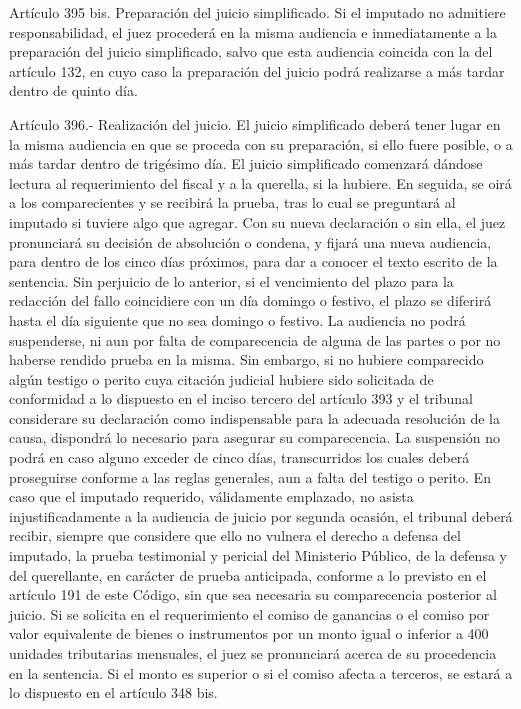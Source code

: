     Artículo 395 bis. Preparación del juicio simplificado. Si el imputado no admitiere responsabilidad, el juez procederá en la misma audiencia e inmediatamente a la preparación del juicio simplificado, salvo que esta audiencia coincida con la del artículo 132, en cuyo caso la preparación del juicio podrá realizarse a más tardar dentro de quinto día.


    Artículo 396.- Realización del juicio. El juicio simplificado deberá tener lugar en la misma audiencia en que se proceda con su preparación, si ello fuere posible, o a más tardar dentro de trigésimo día.
    El juicio simplificado comenzará dándose lectura al requerimiento del fiscal y a la querella, si la hubiere. En seguida, se oirá a los comparecientes y se recibirá la prueba, tras lo cual se preguntará al imputado si tuviere algo que agregar. Con su nueva declaración o sin ella, el juez pronunciará su decisión de absolución o condena, y fijará una nueva audiencia, para dentro de los cinco días próximos, para dar a conocer el texto escrito de la sentencia. Sin perjuicio de lo anterior, si el vencimiento del plazo para la redacción del fallo coincidiere con un día domingo o festivo, el plazo se diferirá hasta el día siguiente que no sea domingo o festivo.
    La audiencia no podrá suspenderse, ni aun por falta de comparecencia de alguna de las partes o por no haberse rendido prueba en la misma.
    Sin embargo, si no hubiere comparecido algún testigo o perito cuya citación judicial hubiere sido solicitada de conformidad a lo dispuesto en el inciso tercero del artículo 393 y el tribunal considerare su declaración como indispensable para la adecuada resolución de la causa, dispondrá lo necesario para asegurar su comparecencia. La suspensión no podrá en caso alguno exceder de cinco días, transcurridos los cuales deberá proseguirse conforme a las reglas generales, aun a falta del testigo o perito.
    En caso que el imputado requerido, válidamente emplazado, no asista injustificadamente a la audiencia de juicio por segunda ocasión, el tribunal deberá recibir, siempre que considere que ello no vulnera el derecho a defensa del imputado, la prueba testimonial y pericial del Ministerio Público, de la defensa y del querellante, en carácter de prueba anticipada, conforme a lo previsto en el artículo 191 de este Código, sin que sea necesaria su comparecencia posterior al juicio.
    Si se solicita en el requerimiento el comiso de ganancias o el comiso por valor equivalente de bienes o instrumentos por un monto igual o inferior a 400 unidades tributarias mensuales, el juez se pronunciará acerca de su procedencia en la sentencia. Si el monto es superior o si el comiso afecta a terceros, se estará a lo dispuesto en el artículo 348 bis.




